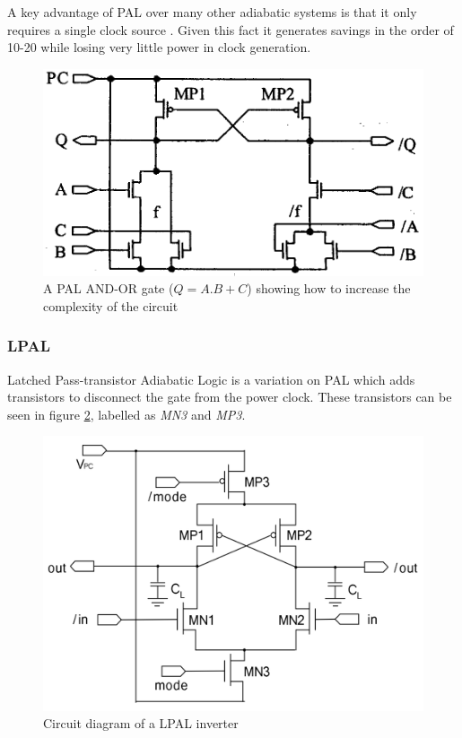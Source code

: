 A key advantage of PAL over many other adiabatic systems is that it only requires a single clock source \cite{PALsingle, PAL}.
Given this fact it generates savings in the order of 10-20 \cite{PAL} while losing very little power in clock generation.

\begin{figure}
	\centering
	\includegraphics[width=\columnwidth]{../../images/palandor.png}
	\caption{A PAL AND-OR gate ($Q=A.B+C$) showing how to increase the complexity of the circuit \cite{PAL}}
	\label{fig:palandor}
\end{figure}


\subsubsection{LPAL}
\label{sec:LPAL}
Latched Pass-transistor Adiabatic Logic is a variation on PAL which adds transistors to disconnect the gate from the power clock.
These transistors can be seen in figure \ref{fig:lpal}, labelled as \emph{MN3} and \emph{MP3}.

\begin{figure}
	\centering
	\includegraphics[width=\columnwidth]{../../images/LPAL.png}
	\caption{Circuit diagram of a LPAL inverter \cite{LPAL}}
	\label{fig:lpal}
\end{figure}

